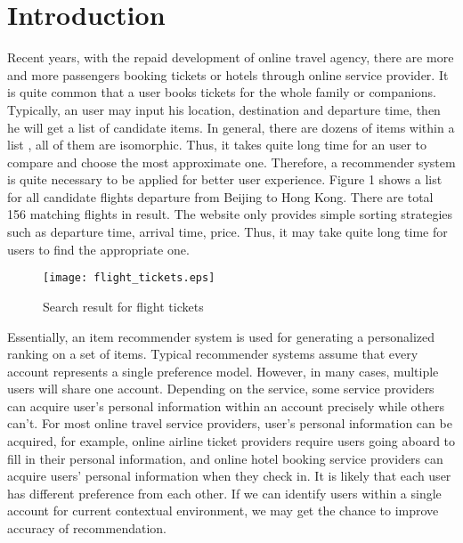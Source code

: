 \documentclass{sig-alternate-05-2015}
\begin{document}

\section{Introduction}
Recent years, with the repaid development of online travel agency, there are more and more passengers booking tickets or hotels through online service provider. It is quite common that a user books tickets for the whole family or companions. Typically, an user may input his location, destination and departure time, then he will get a list of candidate items. In general, there are dozens of items within a list , all of them are isomorphic. Thus, it takes quite long time for an user to compare and choose the most approximate one. Therefore, a recommender system is quite necessary to be applied for better user experience. Figure 1 shows a list for all candidate flights departure from Beijing to Hong Kong. There are total 156 matching flights in result. The website only provides simple sorting strategies such as departure time, arrival time, price. Thus, it may take quite long time for users to find the appropriate one.\par
\begin{figure}[!hbt]
\centering
\texttt{[image: flight\_tickets.eps]}
\caption{Search result for flight tickets}
\label{fig:Prob}
\end{figure}\par
Essentially, an item recommender system is used for generating a personalized ranking on a set of items\cite{lv:rec}. Typical recommender systems assume that every account represents a single preference model. However, in many cases, multiple users will share one account. Depending on the service, some service providers can acquire user's personal information within an account precisely while others can't. For most online travel service providers, user's personal information can be acquired, for example, online airline ticket providers require users going aboard to fill in their personal information, and online hotel booking service providers can acquire users' personal information when they check in. It is likely that each user has different preference from each other. If we can identify users within a single account for current contextual environment, we may get the chance to improve accuracy of recommendation.\par
\end{document}
